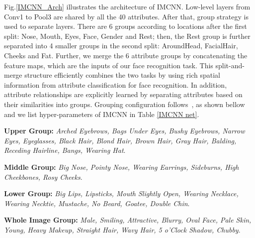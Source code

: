 \documentclass[wcp]{jmlr}
\begin{document}
	Fig.\ref{IMCNN_Arch} illustrates the architecture of IMCNN. Low-level layers from Conv1 to Pool3 are shared by all the 40 attributes. After that, group strategy is used to separate layers. There are 6 groups according to locations after the first split: Nose, Mouth, Eyes, Face, Gender and Rest; then, the Rest group is further separated into 4 smaller groups in the second split: AroundHead, FacialHair, Cheeks and Fat. Further, we merge the 6 attribute groups by concatenating the feature maps, which are the inputs of our face recognition task. This split-and-merge structure efficiently combines the two tasks by using rich spatial information from attribute classification for face recognition. In addition, attribute relationships are explicitly learned by separating attributes based on their similarities into groups. Grouping configuration follows~\cite{MCNN}, as shown bellow and we list hyper-parameters of IMCNN in Table \ref{IMCNN net}.
	
	\textbf{Upper Group:} \emph{Arched Eyebrows, Bags Under Eyes, Bushy Eyebrows, Narrow Eyes, Eyeglasses, Black Hair, Blond Hair, Brown Hair, Gray Hair, Balding, Receding Hairline, Bangs,  Wearing Hat}.
	
	\textbf{Middle Group:} \emph{Big Nose, Pointy Nose, Wearing Earrings, Sideburns, High Cheekbones, Rosy Cheeks}.
	
	\textbf{Lower Group:} \emph{Big Lips, Lipsticks, Mouth Slightly Open, Wearing Necklace, Wearing Necktie, Mustache, No Beard, Goatee, Double Chin}.
	
	\textbf{Whole Image Group:} \emph{Male, Smiling, Attractive, Blurry, Oval Face, Pale Skin, Young, Heavy Makeup, Straight Hair, Wavy Hair, 5 o'Clock Shadow, Chubby}.
	
\end{document}
